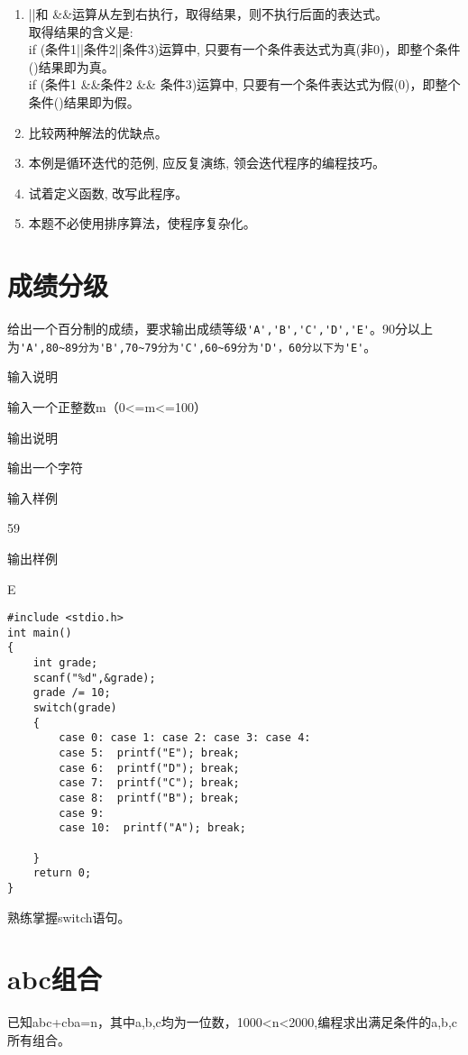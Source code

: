 \begin{note}[要点]
	\begin{enumerate}
		\item ||和 \&\&运算从左到右执行，取得结果，则不执行后面的表达式。\\
		取得结果的含义是: \\
		if (条件1||条件2||条件3)运算中, 只要有一个条件表达式为真(非0)，即整个条件()结果即为真。 \\
		if (条件1 \&\&条件2 \&\& 条件3)运算中, 只要有一个条件表达式为假(0)，即整个条件()结果即为假。
		\item 比较两种解法的优缺点。
		\item 本例是循环迭代的范例, 应反复演练, 领会迭代程序的编程技巧。
		\item 试着定义函数, 改写此程序。
		\item 本题不必使用排序算法，使程序复杂化。
	\end{enumerate}	
\end{note}

\section{成绩分级}	
给出一个百分制的成绩，要求输出成绩等级\lstinline|'A','B','C','D','E'|。90分以上为\lstinline|'A',80~89分为'B',70~79分为'C',60~69分为'D'，60分以下为'E'|。

输入说明	

输入一个正整数m（0<=m<=100）

输出说明
	
输出一个字符

输入样例
	
59

输出样例
	
E

\begin{lstlisting}
#include <stdio.h>
int main()
{
	int grade;
	scanf("%d",&grade);
	grade /= 10;
	switch(grade)
	{
		case 0: case 1: case 2: case 3: case 4: 
		case 5:  printf("E"); break;
		case 6:  printf("D"); break;
		case 7:  printf("C"); break;
		case 8:  printf("B"); break;
		case 9:
		case 10:  printf("A"); break;
		
	}
	return 0;
} 
\end{lstlisting}

\begin{note}[要点]
	熟练掌握switch语句。
\end{note}

\section{abc组合}	
已知abc+cba=n，其中a,b,c均为一位数，1000<n<2000,编程求出满足条件的a,b,c所有组合。

